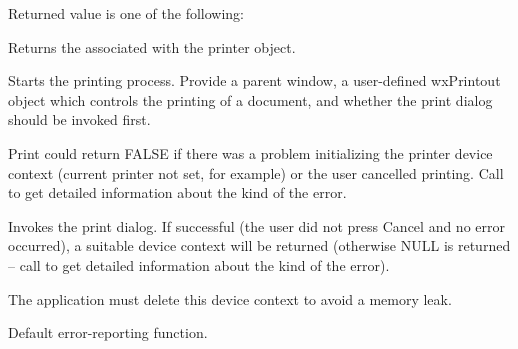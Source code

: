 Returned value is one of the following:

\twocolwidtha{7cm}
\begin{twocollist}\itemsep=0pt
\end{twocollist}


\label{wxprintergetprintdialogdata}


Returns the  associated with the printer object.

\label{wxprinterprint}


Starts the printing process. Provide a parent window, a user-defined wxPrintout object which controls
the printing of a document, and whether the print dialog should be invoked first.

Print could return FALSE if there was a problem initializing the printer device context
(current printer not set, for example) or the user cancelled printing. Call
 to get detailed
information about the kind of the error.

\label{wxprinterprintdialog}


Invokes the print dialog. If successful (the user did not press Cancel
and no error occurred), a suitable device context will be returned
(otherwise NULL is returned -- call
 to get detailed
information about the kind of the error).

The application must delete this device context to avoid a memory leak.

\label{wxprinterreporterror}


Default error-reporting function.

\label{wxprintersetup}

